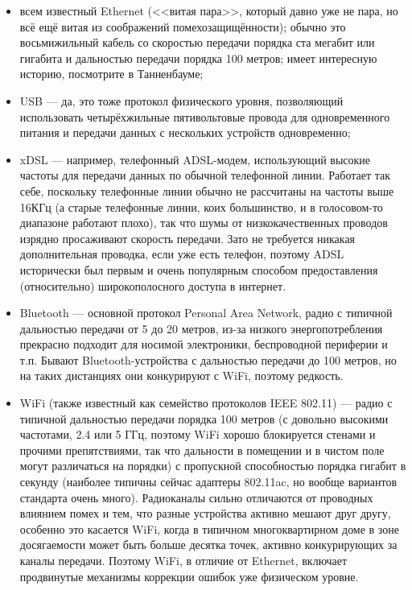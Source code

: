 \documentclass{../../text-style}
\begin{document}
\begin{itemize}
    \item всем известный Ethernet (<<витая пара>>, который давно уже не пара, но всё ещё витая из соображений помехозащищённости); обычно это восьмижильный кабель со скоростью передачи порядка ста мегабит или гигабита и дальностью передачи порядка 100 метров; имеет интересную историю, посмотрите в Танненбауме;
    \item USB --- да, это тоже протокол физического уровня, позволяющий использовать четырёхжильные пятивольтовые провода для одновременного питания и передачи данных с нескольких устройств одновременно;
    \item xDSL --- например, телефонный ADSL-модем, использующий высокие частоты для передачи данных по обычной телефонной линии. Работает так себе, поскольку телефонные линии обычно не рассчитаны на частоты выше 16КГц (а старые телефонные линии, коих большинство, и в голосовом-то диапазоне работают плохо), так что шумы от низкокачественных проводов изрядно просаживают скорость передачи. Зато не требуется никакая дополнительная проводка, если уже есть телефон, поэтому ADSL исторически был первым и очень популярным способом предоставления (относительно) широкополосного доступа в интернет.
    \item Bluetooth --- основной протокол Personal Area Network, радио с типичной дальностью передачи от 5 до 20 метров, из-за низкого энергопотребления прекрасно подходит для носимой электроники, беспроводной периферии и т.п. Бывают Bluetooth-устройства с дальностью передачи до 100 метров, но на таких дистанциях они конкурируют с WiFi, поэтому редкость.
    \item WiFi (также известный как семейство протоколов IEEE 802.11) --- радио с типичной дальностью передачи порядка 100 метров (с довольно высокими частотами, 2.4 или 5 ГГц, поэтому WiFi хорошо блокируется стенами и прочими препятствиями, так что дальности в помещении и в чистом поле могут различаться на порядки) с пропускной способностью порядка гигабит в секунду (наиболее типичны сейчас адаптеры 802.11ac, но вообще вариантов стандарта очень много). Радиоканалы сильно отличаются от проводных влиянием помех и тем, что разные устройства активно мешают друг другу, особенно это касается WiFi, когда в типичном многоквартирном доме в зоне досягаемости может быть больше десятка точек, активно конкурирующих за каналы передачи. Поэтому WiFi, в отличие от Ethernet, включает продвинутые механизмы коррекции ошибок уже физическом уровне.

\end{itemize}
\end{document}
